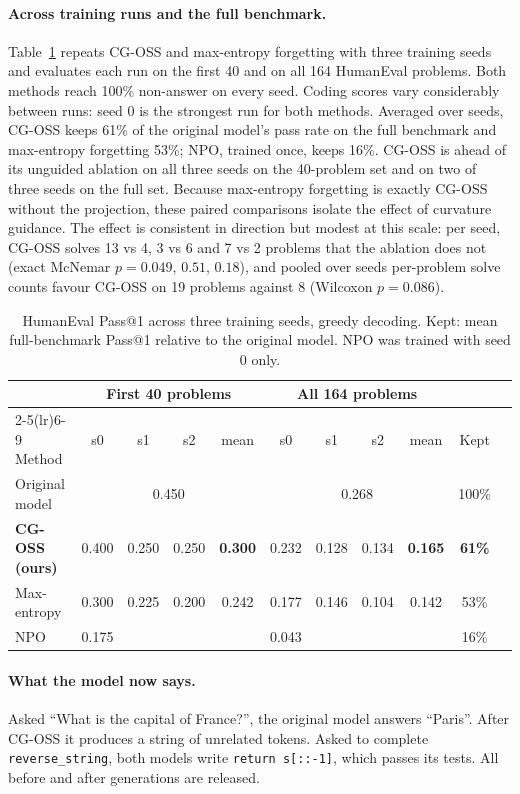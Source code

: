 \documentclass{article}
\begin{document}
\paragraph{Across training runs and the full benchmark.}
Table~\ref{tab:seeds} repeats CG-OSS and max-entropy forgetting with three training seeds and evaluates each run on the first 40 and on all 164 HumanEval problems. Both methods reach 100\% non-answer on every seed. Coding scores vary considerably between runs: seed 0 is the strongest run for both methods. Averaged over seeds, CG-OSS keeps 61\% of the original model's pass rate on the full benchmark and max-entropy forgetting 53\%; NPO, trained once, keeps 16\%. CG-OSS is ahead of its unguided ablation on all three seeds on the 40-problem set and on two of three seeds on the full set. Because max-entropy forgetting is exactly CG-OSS without the projection, these paired comparisons isolate the effect of curvature guidance. The effect is consistent in direction but modest at this scale: per seed, CG-OSS solves 13 vs 4, 3 vs 6 and 7 vs 2 problems that the ablation does not (exact McNemar $p=0.049$, $0.51$, $0.18$), and pooled over seeds per-problem solve counts favour CG-OSS on 19 problems against 8 (Wilcoxon $p=0.086$).

\begin{table}[t]
\centering
\small
\caption{HumanEval Pass@1 across three training seeds, greedy decoding. Kept: mean full-benchmark Pass@1 relative to the original model. NPO was trained with seed 0 only.}
\label{tab:seeds}
\begin{tabular}{lcccccccccc}
\toprule
 & \multicolumn{4}{c}{First 40 problems} & \multicolumn{4}{c}{All 164 problems} & \\
\cmidrule(lr){2-5}\cmidrule(lr){6-9}
Method & s0 & s1 & s2 & mean & s0 & s1 & s2 & mean & Kept \\
\midrule
Original model & \multicolumn{4}{c}{0.450} & \multicolumn{4}{c}{0.268} & 100\% \\
\textbf{CG-OSS (ours)} & 0.400 & 0.250 & 0.250 & \textbf{0.300} & 0.232 & 0.128 & 0.134 & \textbf{0.165} & \textbf{61\%} \\
Max-entropy & 0.300 & 0.225 & 0.200 & 0.242 & 0.177 & 0.146 & 0.104 & 0.142 & 53\% \\
NPO & 0.175 & & & & 0.043 & & & & 16\% \\
\bottomrule
\end{tabular}
\end{table}


\paragraph{What the model now says.}
Asked ``What is the capital of France?'', the original model answers ``Paris''. After CG-OSS it produces a string of unrelated tokens. Asked to complete \texttt{reverse\_string}, both models write \texttt{return s[::-1]}, which passes its tests. All before and after generations are released.
\end{document}
